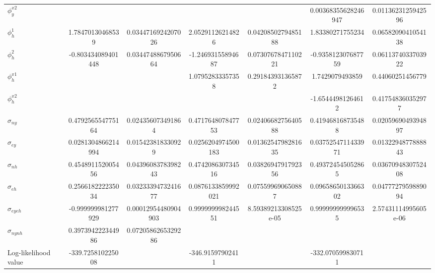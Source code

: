 \documentclass[12pt]{article}
\begin{document}
\begin{outline}[enumerate]
\begin{landscape}
\begin{table}[]
\begin{threeparttable}
\begin{tabular}{@{}lSSSSSS@{}}
						$\phi^{x2}_{y}$ &  &  &  &  & 0.00368355628246947 & 0.0113623125942596 \\[2pt] 

						$\phi^1_{h}$ & 1.78470130468539 & 0.0344716924207026 & 2.05291126214826 & 0.0420850279485188 & 1.83380271755234 & 0.0658209041054138 \\[2pt] 

						$\phi^2_{h}$ & -0.803434089401448 & 0.0344748867950664 & -1.24693155894687 & 0.0730767847110221 & -0.935812307687759 & 0.0611374033703922 \\[2pt] 

						$\phi^{x1}_{h}$ &  &  & 1.07952833357358 & 0.291843931365872 & 1.7429079493859 & 0.44060251456779 \\[2pt] 

						$\phi^{x2}_{h}$ &  &  &  &  & -1.65444981264612 & 0.417548360352977 \\[2pt] 

						$\sigma_{ny}$ & 0.479256554775164 & 0.024356073491864 & 0.471764807847753 & 0.0240668275640588 & 0.419468168735488 & 0.0205969049394897 \\[2pt] 

						$\sigma_{ey}$ & 0.0281304866214994 & 0.015423818330929 & 0.0256204974500183 & 0.0136254798281635 & 0.0375254711433971 & 0.0132294877888843 \\[2pt] 

						$\sigma_{nh}$ & 0.454891152005456 & 0.0439608378398243 & 0.474208630734516 & 0.0382694791792356 & 0.493724545052865 & 0.0367094830752408 \\[2pt] 

						$\sigma_{eh}$ & 0.256618222235034 & 0.0323339473241677 & 0.0876133859992021 & 0.075599690650887 & 0.0965865013366302 & 0.0477727959889094 \\[2pt] 

						$\sigma_{eyeh}$ & -0.999999981277929 & 0.00012954480904903 & 0.999999998244551 & 8.59389213308525e-05 & 0.999999999996535 & 2.57431114995605e-06 \\[2pt] 

						$\sigma_{nynh}$ & 0.397394222344986 & 0.0720586265329286 &  &  &  &  \\[2pt] 

						Log-likelihood value & -339.725810225008 &  & -346.91597902411 &  & -332.070599830711 &  \\[2pt] 


\end{tabular}
\end{threeparttable}
\end{table}
\end{landscape}
\end{outline}
\end{document}
